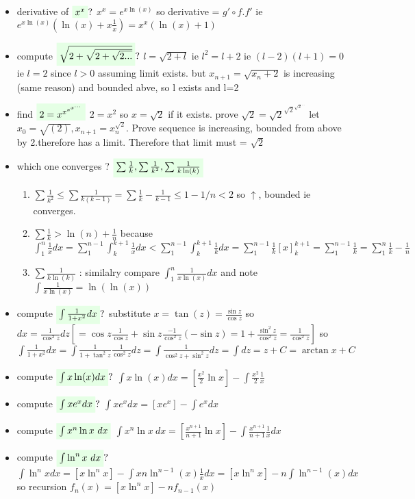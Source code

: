 \documentclass[10pt,landscape,a4paper]{article}
\let\displaystyle\textstyle
\newcommand{\myhighlight}[1]{\colorbox{green!10}{$\displaystyle #1$}}
\begin{document}
\begin{multicols*}{4}
\begin{spacing}{0.1}
\begin{itemize}
\item derivative of $ \myhighlight{x^x} ?$ $x^x=e^{x\ln(x)}$ so derivative = $g' \circ f . f'$ ie $e^{x\ln(x)} (\ln(x)+x \frac{1}{x})=x^x(\ln(x)+1)$

\item compute $ \myhighlight{ \sqrt{ 2 + \sqrt{2 + \sqrt{2 ...} }} } ?$ $l=\sqrt{2+l}$ ie $l^2=l+2$ ie $(l-2)(l+1)=0$ ie $l=2$ since $l>0$ assuming limit exists. but $x_{n+1}=\sqrt{x_n+2}$ is increasing (same reason) and bounded abve, so l exists and l=2

\item find $ \myhighlight{ 2=x^{x^{x^{x^{...}}}} } $ $2 = x^2 $ so $x=\sqrt{2}$ if it exists. prove $\sqrt{2}=\sqrt{2}^ { \sqrt{2} ^ { \sqrt{2} ^ { ...}} } $ let $x_0=\sqrt{(2)},x_{n+1}=x_n^{\sqrt{2}}$. Prove sequence is increasing, bounded from above by 2.therefore has a limit. Therefore that limit must = $\sqrt{2}$

\item which one converges ? $ \myhighlight{ \sum \frac{1}{k},\sum \frac{1}{k^2},\sum \frac{1}{k\ln(k)} }$
\begin{enumerate}
\item $\sum \frac{1}{k^2} \le \sum \frac{1}{k(k-1)}=\sum \frac{1}{k} -\frac{1}{k-1} \le 1-1/n <2 $ so $\uparrow$, bounded ie converges.
\item $\sum \frac{1}{k} > \ln(n) + \frac{1}{n}$ because $\int_{1}^{n} \frac{1}{x} dx = \sum_{1}^{n-1} \int_{k}^{k+1} \frac{1}{x} dx < \sum_{1}^{n-1} \int_{k}^{k+1} \frac{1}{k} dx = \sum_{1}^{n-1} \frac{1}{k} [x]_{k}^{k+1} = \sum_{1}^{n-1} \frac{1}{k} = \sum_{1}^{n} \frac{1}{k} - \frac{1}{n}$

\item $\sum \frac{1}{k\ln(k)} $ : similalry compare $\int_{1}^{n} \frac{1}{x\ln(x)} dx $ and note $\int \frac{1}{x\ln(x)} = \ln(\ln(x))$
\end{enumerate}

\item compute $ \myhighlight{ \int \frac{1}{1+x^2} dx } ?$ substitute $x=\tan(z)=\frac{\sin z}{\cos z}$ so $dx= \frac{1}{\cos^2z} dz [= \cos z \frac{1}{\cos z} + \sin z  \frac{-1}{\cos^2 z} (-\sin z) = 1 + \frac{\sin^2 z}{\cos^2 z} = \frac{1}{\cos^2 z} ]$ so $\int \frac{1}{1+x^2} dx = \int \frac{1}{1+\tan^2z} \frac{1}{\cos^2z} dz = \int \frac{1}{\cos^2z + \sin^2z} dz = \int dz = z + C = \arctan x + C$

\item compute $ \myhighlight{ \int x \ln(x) dx } ?$ $\int x \ln(x) dx=[\frac{x^2}{2}\ln x] - \int \frac{x^2}{2} \frac{1}{x} $
\item compute $ \myhighlight{ \int x e^x dx } ?$ $\int x e^x dx = [x e^x] - \int e^x dx$
\item compute $ \myhighlight{ \int x^n \ln x\ dx }$ $\int x^n \ln x\ dx= [\frac{x^{n+1}}{n+1} \ln x] -\int \frac{x^{n+1}}{n+1} \frac{1}{x} dx $  
\item compute $ \myhighlight{ \int \ln^n x\ dx } ?$ $\int \ln^n x dx = [x \ln^n x] - \int x n \ln^{n-1}(x) \frac{1}{x} dx =  [x \ln^n x] - n \int \ln^{n-1}(x) dx $ so recursion $f_n(x) = [x \ln^n x] - n f_{n-1}(x) $


\end{itemize}
\end{spacing}
\end{multicols*}
\end{document}
